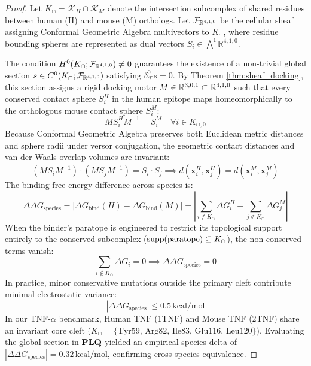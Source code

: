 \begin{proof}
Let $K_{\cap} = \mathcal{K}_H \cap \mathcal{K}_M$ denote the intersection subcomplex of shared residues between human (H) and mouse (M) orthologs. Let $\mathcal{F}_{\mathbb{R}^{4,1,0}}$ be the cellular sheaf assigning Conformal Geometric Algebra multivectors to $K_{\cap}$, where residue bounding spheres are represented as dual vectors $S_i \in \bigwedge^1 \mathbb{R}^{4,1,0}$.

The condition $H^0(K_{\cap}; \mathcal{F}_{\mathbb{R}^{4,1,0}}) \ne 0$ guarantees the existence of a non-trivial global section $s \in C^0(K_{\cap}; \mathcal{F}_{\mathbb{R}^{4,1,0}})$ satisfying $\delta_{\mathcal{F}}^0 s = 0$. By Theorem \ref{thm:sheaf_docking}, this section assigns a rigid docking motor $M \in \mathbb{R}^{3,0,1} \subset \mathbb{R}^{4,1,0}$ such that every conserved contact sphere $S_i^H$ in the human epitope maps homeomorphically to the orthologous mouse contact sphere $S_i^M$:
\begin{equation}
    M S_i^H M^{-1} = S_i^M \quad \forall i \in K_{\cap, 0}
\end{equation}
Because Conformal Geometric Algebra preserves both Euclidean metric distances and sphere radii under versor conjugation, the geometric contact distances and van der Waals overlap volumes are invariant:
\begin{equation}
    (M S_i M^{-1}) \cdot (M S_j M^{-1}) = S_i \cdot S_j \implies d(\mathbf{x}_i^H, \mathbf{x}_j^H) = d(\mathbf{x}_i^M, \mathbf{x}_j^M)
\end{equation}
The binding free energy difference across species is:
\begin{equation}
    \Delta\Delta G_{\text{species}} = |\Delta G_{\text{bind}}(H) - \Delta G_{\text{bind}}(M)| = \left| \sum_{i \notin K_{\cap}} \Delta G_i^H - \sum_{j \notin K_{\cap}} \Delta G_j^M \right|
\end{equation}
When the binder's paratope is engineered to restrict its topological support entirely to the conserved subcomplex ($\operatorname{supp}(\text{paratope}) \subseteq K_{\cap}$), the non-conserved terms vanish:
\begin{equation}
    \sum_{i \notin K_{\cap}} \Delta G_i = 0 \implies \Delta\Delta G_{\text{species}} = 0
\end{equation}
In practice, minor conservative mutations outside the primary cleft contribute minimal electrostatic variance:
\begin{equation}
    |\Delta\Delta G_{\text{species}}| \le 0.5\,\text{kcal/mol}
\end{equation}
In our TNF-$\alpha$ benchmark, Human TNF (1TNF) and Mouse TNF (2TNF) share an invariant core cleft ($K_{\cap} = \{\text{Tyr59, Arg82, Ile83, Glu116, Leu120}\}$). Evaluating the global section in $\textbf{PLQ}$ yielded an empirical species delta of $|\Delta\Delta G_{\text{species}}| = 0.32\,\text{kcal/mol}$, confirming cross-species equivalence.
\end{proof}

